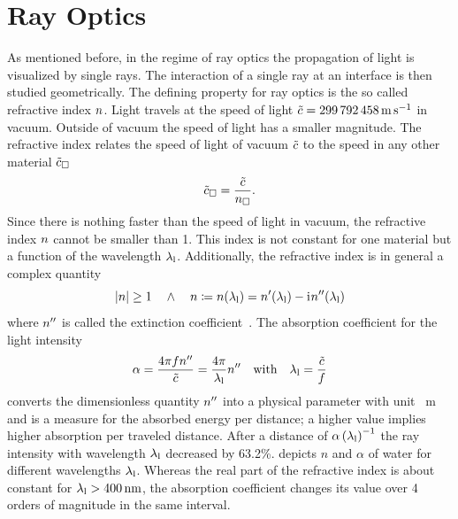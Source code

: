 \section{Ray Optics\label{sec:TO-rayoptics}}

As mentioned before, in the regime of ray optics the propagation of light is 
visualized by single rays. The interaction of a single ray at an interface is 
then studied geometrically. The defining property for ray optics is the so 
called refractive index $n$. Light travels at the speed of light 
$\tilde{\speed}=\SI{299792458}{\m\per\s}$ in vacuum. Outside of vacuum the 
speed of light has a smaller magnitude. The refractive index relates the speed 
of light of vacuum $\tilde{c}$ to the speed in any other material 
$\tilde{c}_{\Box}$
\begin{equation}
  \tilde{c}_{\Box} = \frac{\tilde{c}}{n_{\Box}}.
  \label{eq:TO-lightspeed}
\end{equation}
Since there is nothing faster than the speed of light in vacuum, the refractive 
index $n$ cannot be smaller than 1. This index is not constant for 
one material but a function of the wavelength $\lambda_{\mathrm{l}}$. Additionally, the 
refractive index is in general a complex quantity
\begin{equation}
  \abs{n}\geq 1 \quad \wedge \quad n \coloneqq 
  n(\lambda_{\mathrm{l}}) = n^{\prime}(\lambda_{\mathrm{l}}) - \mathrm{i}\mkern1mu n^{\prime\prime}(\lambda_{\mathrm{l}})
  \label{eq:TO-refractive-index}
\end{equation}
where $n^{\prime\prime}$ is called the extinction coefficient~\cite{Jackson2013}. The 
absorption coefficient for the light intensity~\cite{Hecht2017}
\begin{equation}
  \alpha = \frac{4\pi f n^{\prime\prime}}{\tilde{c}} = 
  \frac{4\pi}{\lambda_{\mathrm{l}}}n^{\prime\prime}\quad\text{with}\quad\lambda_{\mathrm{l}}=\frac{\tilde{c}}{f}
  \label{eq:TO-alpha}
\end{equation}
converts the dimensionless quantity $n^{\prime\prime}$ into a physical parameter with 
unit \si{\per\meter} and is a measure for the absorbed energy per distance; a 
higher value implies higher absorption per traveled distance. After a distance 
of $\alpha\left(\lambda_{\mathrm{l}}\right)^{-1}$ the ray intensity with wavelength $\lambda_{\mathrm{l}}$ 
decreased by 63.2\%.  depicts $n$ and $\alpha$ of water 
for different wavelengths $\lambda_{\mathrm{l}}$. Whereas the real part of the refractive index 
is about constant for $\lal > \SI{400}{\nm}$, the absorption coefficient 
changes its value over 4 orders of magnitude in the same interval.

